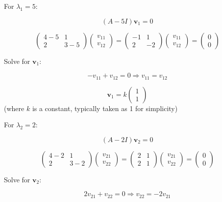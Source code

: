 \documentclass[12pt]{article}
\begin{document}
For \( \lambda_1 = 5 \):

\[ (A - 5I) \mathbf{v}_1 = 0 \]

\[ \begin{pmatrix} 4 - 5 & 1 \\ 2 & 3 - 5 \end{pmatrix} \begin{pmatrix} v_{11} \\ v_{12} \end{pmatrix} = \begin{pmatrix} -1 & 1 \\ 2 & -2 \end{pmatrix} \begin{pmatrix} v_{11} \\ v_{12} \end{pmatrix} = \begin{pmatrix} 0 \\ 0 \end{pmatrix} \]

Solve for \( \mathbf{v}_1 \):

\[ -v_{11} + v_{12} = 0 \Rightarrow v_{11} = v_{12} \]

\[ \mathbf{v}_1 = k \begin{pmatrix} 1 \\ 1 \end{pmatrix} \] (where \( k \) is a constant, typically taken as 1 for simplicity)

For \( \lambda_2 = 2 \):

\[ (A - 2I) \mathbf{v}_2 = 0 \]

\[ \begin{pmatrix} 4 - 2 & 1 \\ 2 & 3 - 2 \end{pmatrix} \begin{pmatrix} v_{21} \\ v_{22} \end{pmatrix} = \begin{pmatrix} 2 & 1 \\ 2 & 1 \end{pmatrix} \begin{pmatrix} v_{21} \\ v_{22} \end{pmatrix} = \begin{pmatrix} 0 \\ 0 \end{pmatrix} \]

Solve for \( \mathbf{v}_2 \):

\[ 2v_{21} + v_{22} = 0 \Rightarrow v_{22} = -2v_{21} \]
\end{document}
